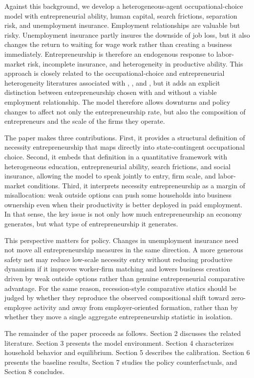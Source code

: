 Against this background, we develop a heterogeneous-agent occupational-choice
model with entrepreneurial ability, human capital, search frictions,
separation risk, and unemployment insurance. Employment relationships are
valuable but risky. Unemployment insurance partly insures the downside of job
loss, but it also changes the return to waiting for wage work rather than
creating a business immediately. Entrepreneurship is therefore an endogenous
response to labor-market risk, incomplete insurance, and heterogeneity in
productive ability. This approach is closely related to the occupational-choice
and entrepreneurial heterogeneity literatures associated with
\citet{buera_2009}, \citet{cagetti_denardi_2006}, and \citet{poschke_2013},
but it adds an explicit distinction between entrepreneurship chosen with and
without a viable employment relationship. The model therefore allows downturns
and policy changes to affect not only the entrepreneurship rate, but also the
composition of entrepreneurs and the scale of the firms they operate.

The paper makes three contributions. First, it provides a structural definition
of necessity entrepreneurship that maps directly into state-contingent
occupational choice. Second, it embeds that definition in a quantitative
framework with heterogeneous education, entrepreneurial ability, search
frictions, and social insurance, allowing the model to speak jointly to entry,
firm scale, and labor-market conditions. Third, it interprets necessity
entrepreneurship as a margin of misallocation: weak outside options can push
some households into business ownership even when their productivity is better
deployed in paid employment. In that sense, the key issue is not only how much
entrepreneurship an economy generates, but what type of entrepreneurship it
generates.

This perspective matters for policy. Changes in unemployment insurance need not
move all entrepreneurship measures in the same direction. A more generous
safety net may reduce low-scale necessity entry without reducing productive
dynamism if it improves worker-firm matching and lowers business creation driven
by weak outside options rather than genuine entrepreneurial comparative
advantage. For the same reason, recession-style comparative statics should be
judged by whether they reproduce the observed compositional shift toward
zero-employee activity and away from employer-oriented formation, rather than
by whether they move a single aggregate entrepreneurship statistic in
isolation.

The remainder of the paper proceeds as follows. Section 2 discusses the related
literature. Section 3 presents the model environment. Section 4 characterizes
household behavior and equilibrium. Section 5 describes the calibration.
Section 6 presents the baseline results, Section 7 studies the policy
counterfactuals, and Section 8 concludes.
